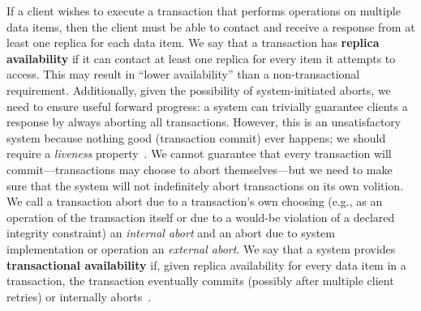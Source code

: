 If a client wishes to execute a transaction that performs operations
on multiple data items, then the client must be able to contact and
receive a response from at least one replica for each data item. We
say that a transaction has \textbf{replica availability} if it can
contact at least one replica for every item it attempts to
access. This may result in ``lower availability'' than a
non-transactional requirement. Additionally, given the possibility of
system-initiated aborts, we need to ensure useful forward progress: a
system can trivially guarantee clients a response by always aborting
all transactions. However, this is an unsatisfactory system because
nothing good (transaction commit) ever happens; we should require a
\textit{liveness} property~\cite{transaction-liveness}. We cannot
guarantee that every transaction will commit---transactions may choose
to abort themselves---but we need to make sure that the system will
not indefinitely abort transactions on its own volition. We call a
transaction abort due to a transaction's own choosing (e.g., as an
operation of the transaction itself or due to a would-be violation of a declared integrity constraint) an \textit{internal abort} and an
abort due to system implementation or operation an \textit{external
  abort}. We say that a system provides \textbf{transactional
  availability} if, given replica availability for every data item in
a transaction, the transaction eventually commits (possibly after
multiple client retries) or internally aborts~\cite{hat-hotos}.

